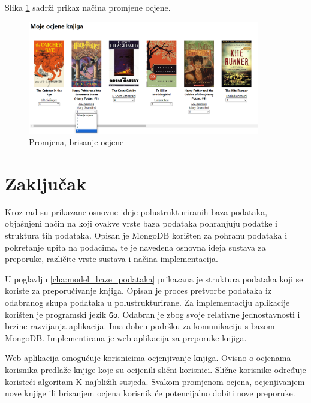 \documentclass[]{foi}
\begin{document}
Slika \ref{fig:promjena_ocjene} sadrži prikaz načina promjene ocjene.

\begin{figure}[h!]
	\centering
	\includegraphics[width=0.9\textwidth]{slike/promjena_ocjene.png}
	\caption{Promjena, brisanje ocjene}
	\label{fig:promjena_ocjene}
\end{figure}

\chapter{Zaključak}

Kroz rad su prikazane osnovne ideje polustrukturiranih baza podataka, objašnjeni način na koji ovakve vrste baza podataka
pohranjuju podatke i struktura tih podataka.
Opisan je MongoDB korišten za pohranu podataka i pokretanje upita na podacima, te je navedena osnovna ideja sustava za preporuke,
različite vrste sustava i načina implementacija.

U poglavlju \ref{cha:model_baze_podataka} prikazana je struktura podataka koji se koriste za preporučivanje knjiga.
Opisan je proces pretvorbe podataka iz odabranog skupa podataka u polustrukturirane.
Za implementaciju aplikacije korišten je programski jezik \texttt{Go}. Odabran je zbog svoje relativne jednostavnosti i brzine
razvijanja aplikacija. Ima dobru podršku za komunikaciju s bazom MongoDB.
Implementirana je web aplikacija za preporuke knjiga.

Web aplikacija omogućuje korisnicima ocjenjivanje knjiga. Ovisno o ocjenama korisnika predlaže knjige koje su ocijenili
slični korisnici. Slične korisnike određuje koristeći algoritam K-najbližih susjeda. Svakom promjenom ocjena, ocjenjivanjem nove
knjige ili brisanjem ocjena korisnik će potencijalno dobiti nove preporuke.

\makebackmatter
\end{document}
